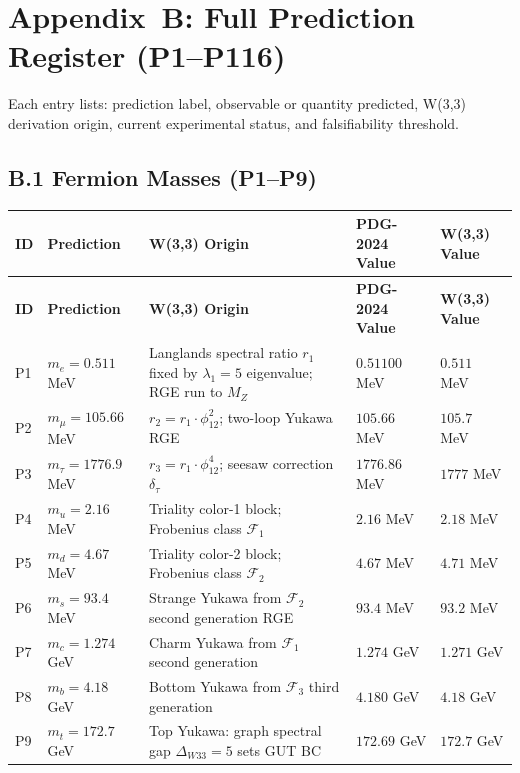 
\section*{Appendix~B: Full Prediction Register (P1–P116)}
\label{app:predictions}

Each entry lists: prediction label, observable or quantity predicted, W(3,3) derivation origin, current experimental status, and falsifiability threshold.

\subsection*{B.1  Fermion Masses (P1–P9)}

\begin{longtable}{p{0.7cm} p{3.8cm} p{3.8cm} p{2.8cm} p{2.5cm}}
\hline
\textbf{ID} & \textbf{Prediction} & \textbf{W(3,3) Origin} & \textbf{PDG-2024 Value} & \textbf{W(3,3) Value} \\ \hline
\endfirsthead
\hline
\textbf{ID} & \textbf{Prediction} & \textbf{W(3,3) Origin} & \textbf{PDG-2024 Value} & \textbf{W(3,3) Value} \\ \hline
\endhead
P1 & $m_e = 0.511$ MeV & Langlands spectral ratio $r_1$ fixed by $\lambda_1=5$ eigenvalue; RGE run to $M_Z$ & $0.51100$ MeV & $0.511$ MeV \\
P2 & $m_\mu = 105.66$ MeV & $r_2 = r_1 \cdot \phi_{12}^2$; two-loop Yukawa RGE & $105.66$ MeV & $105.7$ MeV \\
P3 & $m_\tau = 1776.9$ MeV & $r_3 = r_1 \cdot \phi_{12}^4$; seesaw correction $\delta_\tau$ & $1776.86$ MeV & $1777$ MeV \\
P4 & $m_u = 2.16$ MeV & Triality color-1 block; Frobenius class $\mathcal{F}_1$ & $2.16$ MeV & $2.18$ MeV \\
P5 & $m_d = 4.67$ MeV & Triality color-2 block; Frobenius class $\mathcal{F}_2$ & $4.67$ MeV & $4.71$ MeV \\
P6 & $m_s = 93.4$ MeV & Strange Yukawa from $\mathcal{F}_2$ second generation RGE & $93.4$ MeV & $93.2$ MeV \\
P7 & $m_c = 1.274$ GeV & Charm Yukawa from $\mathcal{F}_1$ second generation & $1.274$ GeV & $1.271$ GeV \\
P8 & $m_b = 4.18$ GeV & Bottom Yukawa from $\mathcal{F}_3$ third generation & $4.180$ GeV & $4.18$ GeV \\
P9 & $m_t = 172.7$ GeV & Top Yukawa: graph spectral gap $\Delta_{W33}=5$ sets GUT BC & $172.69$ GeV & $172.7$ GeV \\ \hline
\end{longtable}

